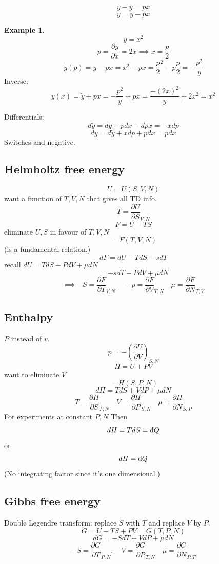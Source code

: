 \documentclass[11pt]{book}
\theoremstyle{definition}
\newtheorem{exm}{Example}[section]
\begin{document}
\[ y- \tilde y = px \] 
\[ \tilde y = y - px \] 
\begin{exm}
	\[ y=x^2 \] 
	\[ p = \frac{\partial y}{\partial x} = 2x \implies x = \frac{p}{2} \] 
	\[ \tilde y(p) = y - px = x^2 - px = \frac{p}{2}^2- p \frac{p}{2} = - \frac{p^2}{y} \] 
	Inverse: 
	\[ y(x) = \tilde y + px = - \frac{p^2}{y} + px = \frac{-(2x)^2}{y} + 2x^2 = x^2 \] 
\end{exm}

Differentials:
\[ d \tilde y = dy - pdx - dp x = -x dp \] 
\[ dy = d \tilde y + x dp + p dx = p dx \] 
Switches and negative.

\subsection{Helmholtz free energy}
\[ U=U(S,V,N) \] want a function of $ T,V,N $ that gives all TD info.
\[ T = \frac{\partial U}{\partial S}_{V,N} \] 
\[ F = U - TS \] eliminate  $ U,S $ in favour of $ T,V,N $ 
\[ = F(T,V,N) \] (is a fundamental relation.)
\[ dF = dU-TdS - sdT \] 
recall $ dU = TdS-PdV+\mu dN $ 
\[ = -sdT - PdV + \mu dN \] 
\[ \implies -S = \frac{\partial F}{\partial T}_{V,N} \quad -p = \frac{\partial F}{\partial V}_{T,N} \quad  \mu  = \frac{\partial F}{\partial N}_{T,V}\] 

\subsection{Enthalpy}
$ P $ instead of $ v $.
\[ p = - \left( \frac{\partial U}{\partial V} \right )_{S,N} \] 
\[ H = U + PV \] want to eliminate $ V $ 
\[= H(S,P,N) \] 
\[ dH = TdS + VdP + \mu dN  \] 
\[ T = \frac{\partial H}{\partial S}_{P,N} \quad V = \frac{\partial H}{\partial P}_{S,N} \quad
\mu = \frac{\partial H}{\partial N}_{S,P}\] 
For experiments at constant $ P,N $ 
Then
\[ dH = TdS = \text{\dj}Q \] 
or 
\[ dH = \text{\dj}Q \] (No integrating factor since it's one dimensional.)

\subsection{Gibbs free energy}
Double Legendre transform: replace $ S $ with $T$ and replace $ V $ by $ P $.
\[ G = U - TS + PV = G(T,P,N)\] 
\[ dG = -SdT + VdP + \mu dN \] 
\[ -S = \frac{\partial G}{\partial T}_{P,N}, \quad V = \frac{\partial G}{\partial P}_{T,N} \quad \mu = \frac{\partial G}{\partial N}_{P,T}\] 
\end{document}
